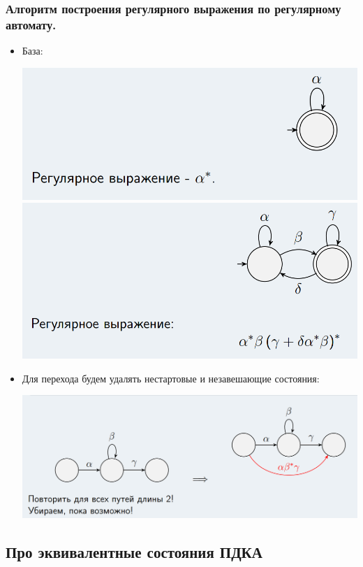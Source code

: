 \documentclass[a4paper,12pt]{article}
\theoremstyle{plain}
\theoremstyle{definition}
\theoremstyle{remark}
\begin{document}
\subsubsection*{Алгоритм построения регулярного выражения по регулярному автомату.}
\begin{itemize}
	\item База:

	      \includegraphics[scale=0.25]{assets/Q1RegexpAutomaton.png}
	      \includegraphics[scale=0.25]{assets/Q2RegexpAutomaton.png}
	\item Для перехода будем удалять нестартовые и незавешающие состояния:

	      \includegraphics[scale=0.25]{assets/StepRegexpAutomaton.png}
\end{itemize}
\subsection{Про эквивалентные состояния ПДКА}
\end{document}
